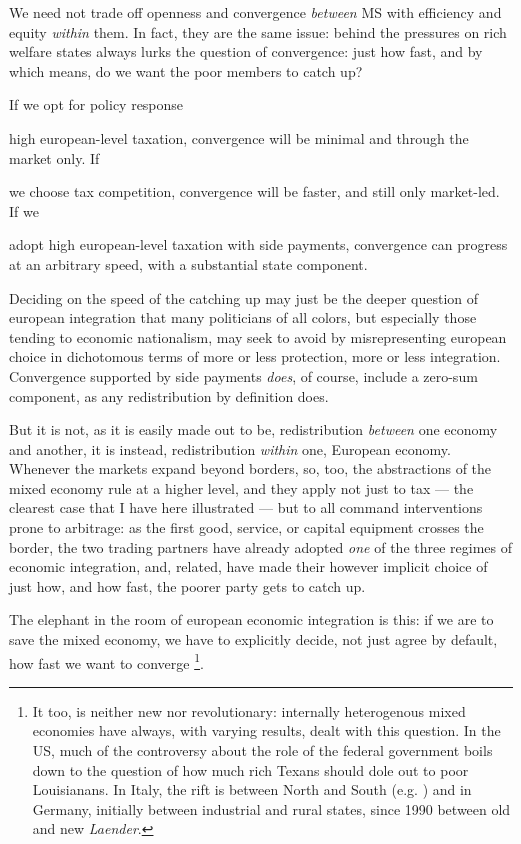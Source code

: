 \documentclass[11pt,a4paper,oneside,openright]{article}
\begin{document}

We need not trade off openness and convergence \emph{between} \gls{MS} with efficiency and equity \emph{within} them. In fact, they are the same issue: behind the pressures on rich welfare states always lurks the question of convergence: just how fast, and by which means, do we want the poor members to catch up?

If we opt for policy response \begin{inparaenum} 
	\item high european-level taxation, convergence will be minimal and through the market only. If \item we choose tax competition, convergence will be faster, and still only market-led. If we \item adopt high european-level taxation with side payments, convergence can progress at an arbitrary speed, with a substantial state component. \end{inparaenum}

Deciding on the speed of the catching up may just be the deeper question of european integration that many politicians of all colors, but especially those tending to economic nationalism, may seek to avoid by misrepresenting european choice in dichotomous terms of more or less protection, more or less integration. Convergence supported by side payments \emph{does}, of course, include a zero-sum component, as any redistribution by definition does. 

But it is not, as it is easily made out to be, redistribution \emph{between} one economy and another, it is instead, redistribution \emph{within} one, European economy. Whenever the markets expand beyond borders, so, too, the abstractions of the mixed economy rule at a higher level, and they apply not just to tax --- the clearest case that I have here illustrated --- but to all command interventions prone to arbitrage: as the first good, service, or capital equipment crosses the border, the two trading partners have already adopted \emph{one} of the three regimes of economic integration, and, related, have made their however implicit choice of just how, and how fast, the poorer party gets to catch up.

The elephant in the room of european economic integration is this: if we are to save the mixed economy, we have to explicitly decide, not just agree by default, how fast we want to converge \footnote{
	It too, is neither new nor revolutionary: internally heterogenous mixed economies have always, with varying results, dealt with this question. In the US, much of the controversy about the role of the federal government boils down to the question of how much rich Texans should dole out to poor Louisianans. In Italy, the rift is between North and South (e.g. \citealt{PutnamLeonardi-1993-aa}) and in Germany, initially between industrial and rural states, since 1990 between old and new \emph{Laender}.}.
\end{document}
